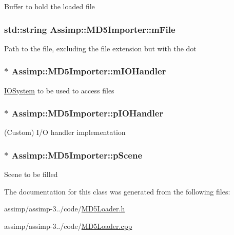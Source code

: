 Buffer to hold the loaded file \hypertarget{class_assimp_1_1_m_d5_importer_ae0550e0a1905777d59081f3ca67cf59f}{
\subsubsection[{m\+File}]{\setlength{\rightskip}{0pt plus 5cm}std\+::string Assimp\+::\+M\+D5\+Importer\+::m\+File\hspace{0.3cm}{\ttfamily [protected]}}}\label{class_assimp_1_1_m_d5_importer_ae0550e0a1905777d59081f3ca67cf59f}
Path to the file, excluding the file extension but with the dot \hypertarget{class_assimp_1_1_m_d5_importer_ae4fe137342a0fccd002c6a36bea21ba5}{
\subsubsection[{m\+I\+O\+Handler}]{$\ast$ Assimp\+::\+M\+D5\+Importer\+::m\+I\+O\+Handler\hspace{0.3cm}{\ttfamily [protected]}}}\label{class_assimp_1_1_m_d5_importer_ae4fe137342a0fccd002c6a36bea21ba5}
\hyperlink{class_assimp_1_1_i_o_system}{I\+O\+System} to be used to access files \hypertarget{class_assimp_1_1_m_d5_importer_ad47907df2a104a4130b56b728ccec5ab}{
\subsubsection[{p\+I\+O\+Handler}]{$\ast$ Assimp\+::\+M\+D5\+Importer\+::p\+I\+O\+Handler\hspace{0.3cm}{\ttfamily [protected]}}}\label{class_assimp_1_1_m_d5_importer_ad47907df2a104a4130b56b728ccec5ab}
(Custom) I/\+O handler implementation \hypertarget{class_assimp_1_1_m_d5_importer_a0b840bcb30b376c7cb45557dcc84d3b0}{
\subsubsection[{p\+Scene}]{$\ast$ Assimp\+::\+M\+D5\+Importer\+::p\+Scene\hspace{0.3cm}{\ttfamily [protected]}}}\label{class_assimp_1_1_m_d5_importer_a0b840bcb30b376c7cb45557dcc84d3b0}
Scene to be filled 

The documentation for this class was generated from the following files\+:\begin{DoxyCompactItemize}
\item 
assimp/assimp-\/3../code/\hyperlink{_m_d5_loader_8h}{M\+D5\+Loader.\+h}\item 
assimp/assimp-\/3../code/\hyperlink{_m_d5_loader_8cpp}{M\+D5\+Loader.\+cpp}\end{DoxyCompactItemize}
